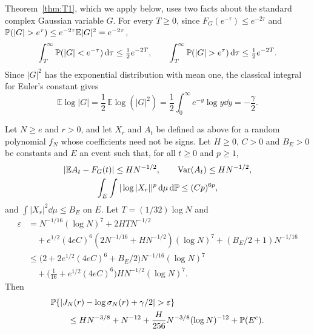 Theorem~\ref{thm:T1}, which we apply below, uses two facts about the
standard complex Gaussian variable $G$. For every $T\ge0$, since
$F_G(e^{-\tau})\le e^{-2\tau}$ and
$\Prob(|G|>e^\tau)\le e^{-2\tau}\mathbb E|G|^2=e^{-2\tau}$,
\begin{equation}
 \int_T^\infty\Prob(|G|<e^{-\tau})\dd\tau\le\tfrac12e^{-2T},\qquad
 \int_T^\infty\Prob(|G|>e^\tau)\dd\tau\le\tfrac12e^{-2T}.
 \label{eq:gaussian-log-tails}
\end{equation}
Since $|G|^2$ has the exponential distribution with mean one, the
classical integral for Euler's constant gives
\begin{equation}
 \mathbb E\log|G|=\frac12\,\mathbb E\log(|G|^2)
 =\frac12\int_0^\infty e^{-y}\log y\dd y
 =-\frac\gamma2.
 \label{eq:euler-centering}
\end{equation}

\begin{lemma}[Clipping]\label{lem:clipping}
Let $N\ge e$ and $r>0$, and let $X_r$ and $A_t$ be defined as above for a
random polynomial $f_N$ whose coefficients need not be signs.
Let $H\ge0$, $C>0$ and $B_E>0$ be constants and $E$ an event such that,
for all $t\ge0$ and $p\ge1$,
\begin{gather*}
 |\mathbb EA_t-F_G(t)|\le HN^{-1/2},\qquad
 \operatorname{Var}(A_t)\le HN^{-1/2},\\
 \int_E\int|\log|X_r||^p\,\mathrm d\mu\,\mathrm d\mathbb P\le(Cp)^{6p},
\end{gather*}
and $\int|X_r|^2\dd\mu\le B_E$ on $E$. Let $T=(1/32)\log N$ and
\begin{align*}
 \varepsilon&=N^{-1/16}(\log N)^7+2HTN^{-1/2}\\
 &\quad+e^{1/2}(4eC)^6(2N^{-1/16}+HN^{-1/2})(\log N)^7+(B_E/2+1)N^{-1/16}\\
 &\le\bigl(2+2e^{1/2}(4eC)^6+B_E/2\bigr)N^{-1/16}(\log N)^7\\
 &\quad+\bigl(\tfrac1{16}+e^{1/2}(4eC)^6\bigr)HN^{-1/2}(\log N)^7.
\end{align*}
Then
\begin{align*}
 &\Prob\{|J_N(r)-\log\sigma_N(r)+\gamma/2|>\varepsilon\}\\
 &\qquad\le HN^{-3/8}+N^{-12}+\frac{H}{256}N^{-3/8}(\log N)^{-12}
 +\Prob(E^c).
\end{align*}
\end{lemma}

